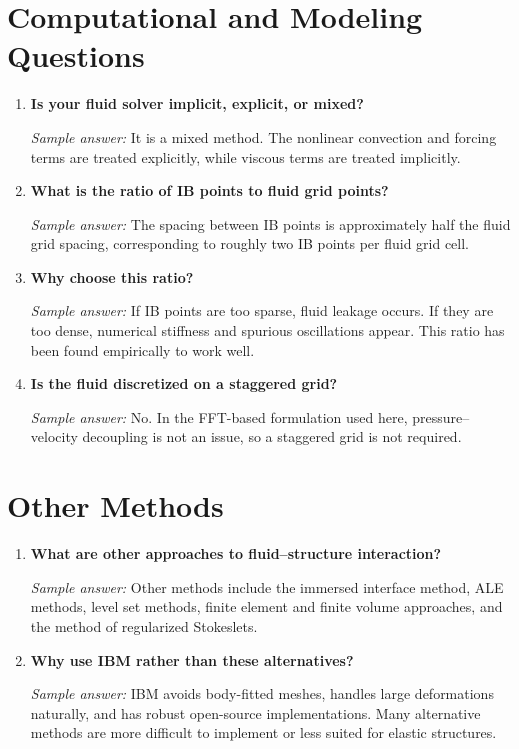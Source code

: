 \documentclass[11pt]{article}
\begin{document}
\section*{Computational and Modeling Questions}

\begin{enumerate}[label=\arabic*.]

\item \textbf{Is your fluid solver implicit, explicit, or mixed?}

\textit{Sample answer:}  
It is a mixed method. The nonlinear convection and forcing terms are treated explicitly, while viscous terms are treated implicitly.

\item \textbf{What is the ratio of IB points to fluid grid points?}

\textit{Sample answer:}  
The spacing between IB points is approximately half the fluid grid spacing, corresponding to roughly two IB points per fluid grid cell.

\item \textbf{Why choose this ratio?}

\textit{Sample answer:}  
If IB points are too sparse, fluid leakage occurs. If they are too dense, numerical stiffness and spurious oscillations appear. This ratio has been found empirically to work well.

\item \textbf{Is the fluid discretized on a staggered grid?}

\textit{Sample answer:}  
No. In the FFT-based formulation used here, pressure--velocity decoupling is not an issue, so a staggered grid is not required.

\end{enumerate}

\section*{Other Methods}

\begin{enumerate}[label=\arabic*.]

\item \textbf{What are other approaches to fluid--structure interaction?}

\textit{Sample answer:}  
Other methods include the immersed interface method, ALE methods, level set methods, finite element and finite volume approaches, and the method of regularized Stokeslets.

\item \textbf{Why use IBM rather than these alternatives?}

\textit{Sample answer:}  
IBM avoids body-fitted meshes, handles large deformations naturally, and has robust open-source implementations. Many alternative methods are more difficult to implement or less suited for elastic structures.

\end{enumerate}
\end{document}
